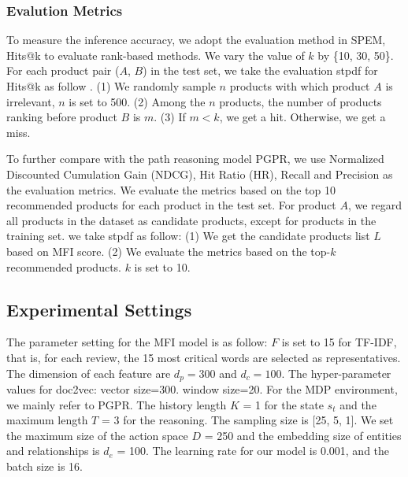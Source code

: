 \documentclass[review]{elsarticle}
\begin{document}
\begin{sloppypar}
\subsubsection{Evalution Metrics}
To measure the inference accuracy, we adopt the evaluation method in SPEM, Hits@k to evaluate rank-based methods.
We vary the value of $k$ by \{10, 30, 50\}. For each product pair ($A$, $B$) in the test set, we take the evaluation stpdf for Hits@k as follow \cite{zhang2019inferring_SPEM}.
(1) We randomly sample $n$ products with which product $A$ is irrelevant, $n$ is set to 500. 
(2) Among the $n$ products, the number of products ranking before product $B$ is $m$. 
(3) If $m<k$, we get a hit. Otherwise, we get a miss. 

To further compare with the path reasoning model PGPR, we use Normalized Discounted Cumulation Gain (NDCG), Hit Ratio (HR), Recall and Precision as the evaluation metrics.
We evaluate the metrics based on the top 10 recommended products for each product in the test set. 
For product $A$, we regard all products in the dataset as candidate products, except for products in the training set. we take stpdf as follow:
(1) We get the candidate products list $L$ based on MFI score.
(2) We evaluate the metrics based on the top-$k$ recommended products. $k$ is set to 10.
\subsection{Experimental Settings}
The parameter setting for the MFI model is as follow: 
$F$ is set to 15 for TF-IDF, that is, for each review, the 15 most critical words are selected as representatives.
The dimension of each feature are $d_p=300$ and $d_c=100$. The hyper-parameter values for doc2vec: vector size=300. window size=20. 
For the MDP  environment, we mainly refer to PGPR.
The history length $K$ = 1 for the state $s_{t}$ and the maximum length $T$ = 3 for the reasoning.
The sampling size is [25, 5, 1].
We set the maximum size of the action space $D$ = 250 and the embedding size of entities and relationships is $d_{e}$ = 100.
The learning rate for our model is 0.001, and the batch size is 16.


\end{sloppypar}
\end{document}
